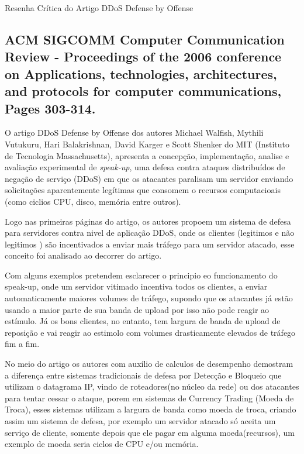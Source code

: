 \documentclass[a4paper,12pt]{article}
\begin{document}
\LARGE
Resenha Crítica do Artigo DDoS Defense by Offense
\large

\subsection*{
	 ACM SIGCOMM  Computer Communication Review - Proceedings of the 2006 conference on Applications, technologies, architectures, and protocols for computer communications, Pages 303-314.
}

\vspace{0.3cm}

 O artigo DDoS Defense by Offense \cite{Walfish:2006:DDO:1151659.1159948} dos autores Michael Walfish, Mythili Vutukuru, Hari Balakrishnan, David Karger  e  Scott Shenker do MIT (Instituto de Tecnologia Massachusetts), apresenta a concepção, implementação, analise e avaliação experimental de \textit{speak-up}, uma defesa contra ataques distribuídos de negação de serviço (DDoS) em que os atacantes paralisam um servidor enviando solicitações aparentemente legítimas que consomem o recursos computacioais (como ciclios CPU, disco, memória entre outros).


\vspace{0.3cm}

 Logo nas primeiras páginas do artigo, os autores propoem um sistema de defesa para servidores contra nivel de aplicação DDoS, onde os clientes (legitimos e não legitimos ) são incentivados a enviar mais tráfego para um servidor atacado, esse conceito foi analisado ao decorrer do artigo.

\vspace{0.3cm}
Com alguns exemplos pretendem esclarecer o principio eo funcionamento do speak-up, onde um servidor vitimado incentiva todos os clientes, a enviar automaticamente maiores volumes de tráfego, supondo que os atacantes já estão usando a maior parte de sua banda de upload por isso não pode reagir ao estímulo. Já os bons clientes, no entanto, tem largura de banda de upload de reposição e vai reagir ao estimolo com volumes drasticamente elevados de tráfego fim a fim.

\vspace{0.3cm}

No meio do artigo os autores com auxílio de calculos de desempenho demostram  a diferença entre sistemas tradicionais de defesa por Detecção e Bloqueio que utilizam o datagrama IP, vindo de roteadores(no núcleo da rede) ou dos atacantes para tentar cessar o ataque, porem em sistemas de Currency Trading (Moeda de Troca), esses sistemas utilizam a largura de banda como moeda de troca, criando assim um sistema de defesa, por exemplo um servidor atacado só aceita um serviço de cliente, somente depois que ele pagar em alguma moeda(recursos), um exemplo de moeda seria ciclos de CPU e/ou memória. 
\end{document}
